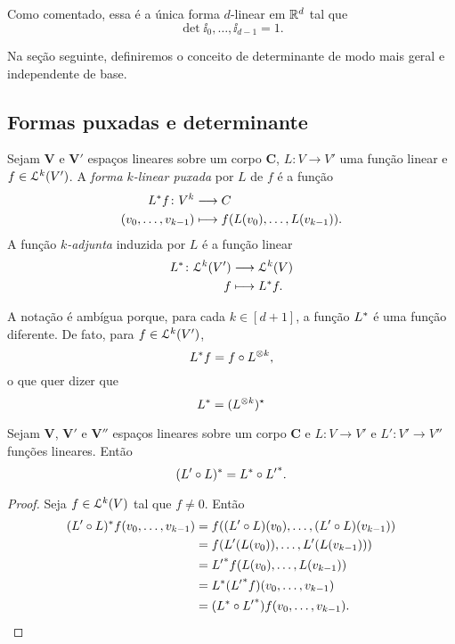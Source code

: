 Como comentado, essa é a única forma $d$-linear em $\mathbb{R}^d$ tal que	\begin{equation*}
	\det{\ii_0,\ldots,\ii_{d-1}}=1.
	\end{equation*}

Na seção seguinte, definiremos o conceito de determinante de modo mais geral e independente de base.

\subsection{Formas puxadas e determinante}

\begin{definition}
Sejam $\bm V$ e $\bm V'$ espaços lineares sobre um corpo $\bm C$, $L \colon V \to V'$ uma função linear e $f \in \mathcal{L}^k(V')$. A \emph{forma $k$-linear puxada} por $L$ de $f$ é a função
	\begin{align*}
	{L^*f}\colon {V^k} &\longrightarrow {C} \\{(v_0,\ldots,v_{k-1})} &\longmapsto f(L(v_0),\ldots,L(v_{k-1})).
	\end{align*}
A função \emph{$k$-adjunta} induzida por $L$ é a função linear
	\begin{align*}
	{L^*}\colon {\mathcal{L}^k(V')} &\longrightarrow {\mathcal{L}^k(V)} \\{f} &\longmapsto L^* f.
	\end{align*}
\end{definition}

A notação é ambígua porque, para cada $k \in [d+1]$, a função $L^*$ é uma função diferente. De fato, para $f \in \mathcal{L}^k(V')$,
	\begin{equation*}
	L^* f = f \circ L^{\otimes k},
	\end{equation*}
o que quer dizer que
	\begin{equation*}
	L ^* = (L^{\otimes k})^\star
	\end{equation*}

\begin{proposition}
Sejam $\bm V$, $\bm V'$ e $\bm V''$ espaços lineares sobre um corpo $\bm C$ e $L\colon V \to V'$ e $L'\colon V' \to V''$ funções lineares. Então
	\begin{equation*}
	(L' \circ L)^* = {L}^* \circ {L'}^*.
	\end{equation*}
\end{proposition}
\begin{proof} Seja $f \in \mathcal{L}^k(V)$ tal que $f \neq 0$. Então
	\begin{align*}
	(L' \circ L)^* f (v_0,\ldots,v_{k-1}) &= f((L' \circ L)(v_0),\ldots,(L' \circ L)(v_{k-1})) \\
		&= f(L'(L(v_0)),\ldots,L'(L(v_{k-1}))) \\
		&= {L'}^* f(L(v_0),\ldots,L(v_{k-1})) \\
		&= L^*({L'}^* f)(v_0,\ldots,v_{k-1}) \\
		&= (L^* \circ {L'}^*) f(v_0,\ldots,v_{k-1}).
	\end{align*}
\end{proof}


